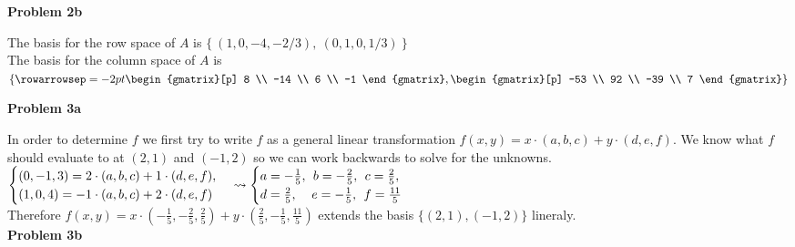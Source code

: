 \documentclass{article}
\newcommand{\problem}[1]{\large\textbf{Problem #1}\normalsize}
\begin{document}
\problem{2b}

The basis for the row space of $A$ is $\{ \: (1, 0, -4, -2/3), \: (0, 1, 0, 1/3)
\: \}$ \\

The basis for the column space of $A$ is
$
\left \{
\rowarrowsep=-2pt
\begin{gmatrix}[p]
  8 \\
  -14 \\
  6 \\
  -1
\end{gmatrix} 
,
\begin{gmatrix}[p]
  -53 \\
  92 \\
  -39 \\
  7
\end{gmatrix} 
\right \}
$

\problem{3a}

In order to determine $f$ we first try to write $f$ as a general linear
transformation $f(x,y) = x \cdot (a, b, c) + y \cdot (d, e, f)$. We know
what $f$ should evaluate to at $(2, 1)$ and $(-1, 2)$ so we can work backwards to
solve for the unknowns.
$
\begin{cases}
  (0, -1, 3) = 2 \cdot (a, b, c) + 1 \cdot (d, e, f), \\
  (1, 0, 4)  = -1 \cdot (a, b, c) + 2 \cdot (d, e, f) 
\end{cases}
\rightsquigarrow
\begin{cases}
  a = -\frac{1}{5}, \:\: b = -\frac{2}{5}, \:\: c = \frac{2}{5}, \\
  d = \frac{2}{5}, \:\:\:\:\:  e = -\frac{1}{5}, \:\: f = \frac{11}{5} \\
\end{cases} \\
$ \\
Therefore
$f(x,y) = x \cdot (-\frac{1}{5}, -\frac{2}{5}, \frac{2}{5}) +
y \cdot (\frac{2}{5},  -\frac{1}{5}, \frac{11}{5} )$
extends the basis $\{ (2, 1), (-1, 2) \}$ lineraly. \\

\problem{3b}
\end{document}
